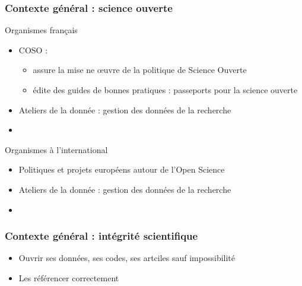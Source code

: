 \begin{frame}
\frametitle{Contexte général : science ouverte}

\begin{block}{Organismes français}
\begin{itemize}
\item[\ding{220}] COSO :
  \begin{itemize}
  \item assure la mise ne \oe uvre de la politique de Science Ouverte
  \item édite des guides de bonnes pratiques : passeports pour la science ouverte
\end{itemize}    
\item[\ding{220}] Ateliers de la donnée : gestion des données de la recherche 
\item[\ding{220}]  
\end{itemize}
\end{block}


\begin{block}{Organismes à l'international}
\begin{itemize}
\item[\ding{220}] Politiques et projets européens autour de l'Open Science 
  
\item[\ding{220}] Ateliers de la donnée : gestion des données de la recherche 
\item[\ding{220}]  
\end{itemize}
\end{block}

\end{frame}

\begin{frame}
\frametitle{Contexte général : intégrité scientifique}

\begin{block}{}
\begin{itemize}
\item Ouvrir ses données, ses codes, ses artciles sauf impossibilité   \\
\item Les référencer correctement \\   
\end{itemize}

\end{block}

\end{frame}




